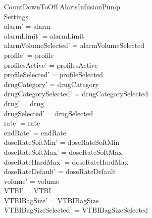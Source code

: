 \begin{schema}{CountDownToOff}
	\Delta AlarisInfusionPump\\
	Settings\\
	\where
	alarm' = alarm\\
	alarmLimit' = alarmLimit\\
	alarmVolumeSelected' = alarmVolumeSelected\\
	profile' = profile\\
	profilesActive' = profilesActive\\  
	  profileSelected' = profileSelected\\
	drugCategory' = drugCategory\\ drugCategorySelected' = drugCategorySelected\\
	drug' = drug\\ drugSelected' = drugSelected\\
	rate' = rate\\
	endRate' = endRate\\
	doseRateSoftMin' = doseRateSoftMin\\
	\pagebreak
	doseRateSoftMax' = doseRateSoftMax\\
	doseRateHardMax' = doseRateHardMax\\
	doseRateDefault' = doseRateDefault\\
	volume' = volume\\
	VTBI' = VTBI\\
	VTBIBagSize' = VTBIBagSize\\ VTBIBagSizeSelected' = VTBIBagSizeSelected\\

\end{schema}

